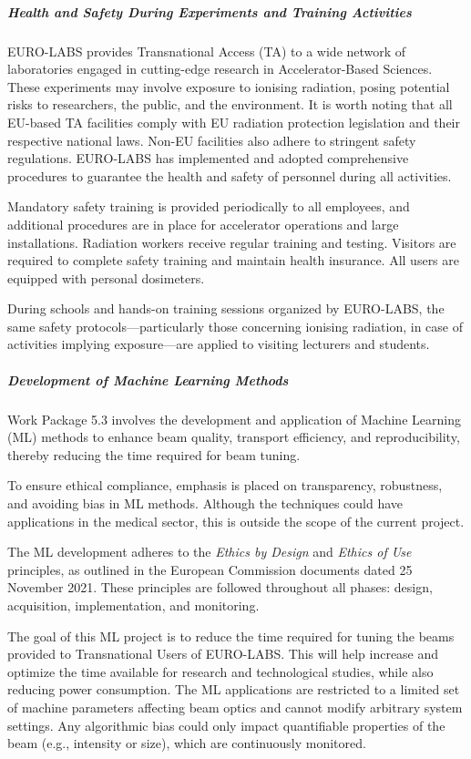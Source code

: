 \subparagraph{Health and Safety During Experiments and Training Activities} \mbox{}


EURO-LABS provides Transnational Access (TA) to a wide network of laboratories engaged in cutting-edge research in Accelerator-Based Sciences. These experiments may involve exposure to ionising radiation, posing potential risks to researchers, the public, and the environment. It is worth noting that all EU-based TA facilities comply with EU radiation protection legislation and their respective national laws. Non-EU facilities also adhere to stringent safety regulations. EURO-LABS has implemented and adopted comprehensive procedures to guarantee the health and safety of personnel during all activities.

Mandatory safety training is provided periodically to all employees, and additional procedures are in place for accelerator operations and large installations. Radiation workers receive regular training and testing. Visitors are required to complete safety training and maintain health insurance. All users are equipped with personal dosimeters.

During schools and hands-on training sessions organized by EURO-LABS, the same safety protocols—particularly those concerning ionising radiation, in case of activities implying exposure—are applied to visiting lecturers and students.

\subparagraph{Development of Machine Learning Methods} \mbox{}

Work Package 5.3 involves the development and application of Machine Learning (ML) methods to enhance beam quality, transport efficiency, and reproducibility, thereby reducing the time required for beam tuning.

To ensure ethical compliance, emphasis is placed on transparency, robustness, and avoiding bias in ML methods. Although the techniques could have applications in the medical sector, this is outside the scope of the current project.

The ML development adheres to the \textit{Ethics by Design} and \textit{Ethics of Use} principles, as outlined in the European Commission documents dated 25 November 2021. These principles are followed throughout all phases: design, acquisition, implementation, and monitoring.

The goal of this ML project is to reduce the time required for tuning the beams provided to Transnational Users of EURO-LABS. This will help increase and optimize the time available for research and technological studies, while also reducing power consumption.
The ML applications are restricted to a limited set of machine parameters affecting beam optics and cannot modify arbitrary system settings. Any algorithmic bias could only impact quantifiable properties of the beam (e.g., intensity or size), which are continuously monitored.

